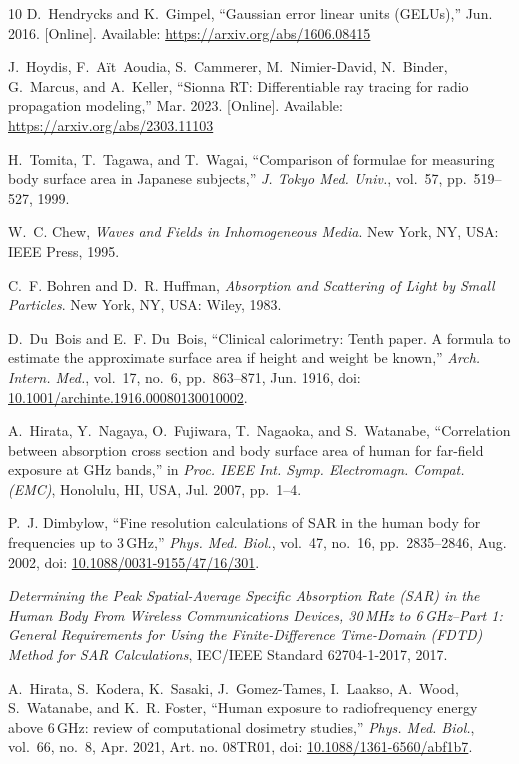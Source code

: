 \documentclass[journal,twocolumn,10pt]{IEEEtran}
\newcommand*{\doi}[1]{\href{https://doi.org/#1}{#1}}
\theoremstyle{plain}
\theoremstyle{remark}
\begin{document}
\begin{thebibliography}{10}
D.~Hendrycks and K.~Gimpel, ``Gaussian error linear units (GELUs),''
  Jun. 2016. [Online]. Available: \url{https://arxiv.org/abs/1606.08415}

J.~Hoydis, F.~A\"{i}t~Aoudia, S.~Cammerer, M.~Nimier-David, N.~Binder,
  G.~Marcus, and A.~Keller, ``Sionna RT: Differentiable ray tracing for
  radio propagation modeling,'' Mar. 2023. [Online]. Available:
  \url{https://arxiv.org/abs/2303.11103}

H.~Tomita, T.~Tagawa, and T.~Wagai, ``Comparison of formulae for
  measuring body surface area in Japanese subjects,'' \emph{J. Tokyo
  Med. Univ.}, vol.~57, pp.~519--527, 1999.

W.~C. Chew, \emph{Waves and Fields in Inhomogeneous Media}.
  New York, NY, USA: IEEE Press, 1995.

C.~F. Bohren and D.~R. Huffman, \emph{Absorption and Scattering of
  Light by Small Particles}.
  New York, NY, USA: Wiley, 1983.

D.~Du~Bois and E.~F. Du~Bois, ``Clinical calorimetry: Tenth paper.
  A formula to estimate the approximate surface area if height and
  weight be known,'' \emph{Arch. Intern. Med.}, vol.~17, no.~6,
  pp.~863--871, Jun. 1916,
  doi: \doi{10.1001/archinte.1916.00080130010002}.

A.~Hirata, Y.~Nagaya, O.~Fujiwara, T.~Nagaoka, and S.~Watanabe,
  ``Correlation between absorption cross section and body surface area
  of human for far-field exposure at GHz bands,'' in \emph{Proc. IEEE
  Int. Symp. Electromagn. Compat. (EMC)}, Honolulu, HI, USA, Jul. 2007,
  pp.~1--4.

P.~J. Dimbylow, ``Fine resolution calculations of SAR in the human body
  for frequencies up to 3\,GHz,'' \emph{Phys. Med. Biol.}, vol.~47,
  no.~16, pp.~2835--2846, Aug. 2002,
  doi: \doi{10.1088/0031-9155/47/16/301}.

\emph{Determining the Peak Spatial-Average Specific Absorption Rate
  (SAR) in the Human Body From Wireless Communications Devices, 30\,MHz
  to 6\,GHz--Part 1: General Requirements for Using the
  Finite-Difference Time-Domain (FDTD) Method for SAR Calculations},
  IEC/IEEE Standard 62704-1-2017, 2017.

A.~Hirata, S.~Kodera, K.~Sasaki, J.~Gomez-Tames, I.~Laakso, A.~Wood,
  S.~Watanabe, and K.~R. Foster, ``Human exposure to radiofrequency
  energy above 6\,GHz: review of computational dosimetry studies,''
  \emph{Phys. Med. Biol.}, vol.~66, no.~8, Apr. 2021, Art. no. 08TR01,
  doi: \doi{10.1088/1361-6560/abf1b7}.


\end{thebibliography}
\end{document}
